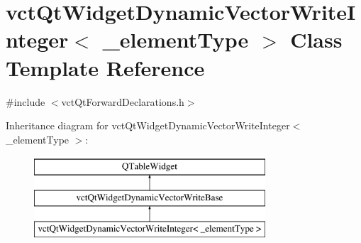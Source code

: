 \hypertarget{classvct_qt_widget_dynamic_vector_write_integer}{\section{vct\-Qt\-Widget\-Dynamic\-Vector\-Write\-Integer$<$ \-\_\-element\-Type $>$ Class Template Reference}
\label{classvct_qt_widget_dynamic_vector_write_integer}
}


{\ttfamily \#include $<$vct\-Qt\-Forward\-Declarations.\-h$>$}

Inheritance diagram for vct\-Qt\-Widget\-Dynamic\-Vector\-Write\-Integer$<$ \-\_\-element\-Type $>$\-:\begin{figure}[H]
\begin{center}
\leavevmode
\includegraphics[height=3.000000cm]{d8/d73/classvct_qt_widget_dynamic_vector_write_integer}
\end{center}
\end{figure}
